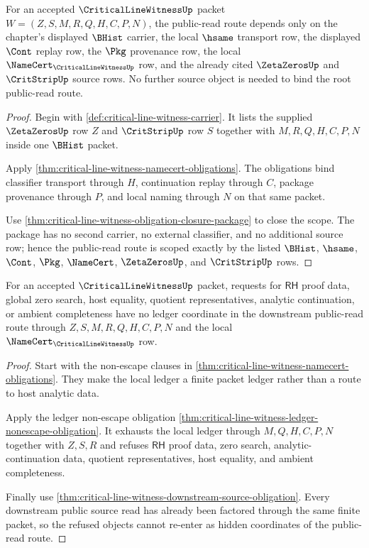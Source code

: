 \begin{theorem}
\label{thm:critical-line-witness-root-scope-binding}
For an accepted $\CriticalLineWitnessUp$ packet $W=(Z,S,M,R,Q,H,C,P,N)$, the
public-read route depends only on the chapter's displayed $\BHist$ carrier,
the local $\hsame$ transport row, the displayed $\Cont$ replay row, the $\Pkg$
provenance row, the local $\NameCert_{\CriticalLineWitnessUp}$ row, and the
already cited $\ZetaZerosUp$ and $\CritStripUp$ source rows. No further source
object is needed to bind the root public-read route.
\end{theorem}
\begin{proof}
Begin with \autoref{def:critical-line-witness-carrier}. It lists the supplied
$\ZetaZerosUp$ row $Z$ and $\CritStripUp$ row $S$ together with $M,R,Q,H,C,P,N$
inside one $\BHist$ packet.

Apply \autoref{thm:critical-line-witness-namecert-obligations}. The obligations
bind classifier transport through $H$, continuation replay through $C$,
package provenance through $P$, and local naming through $N$ on that same
packet.

Use \autoref{thm:critical-line-witness-obligation-closure-package} to close the
scope. The package has no second carrier, no external classifier, and no
additional source row; hence the public-read route is scoped exactly by the
listed $\BHist$, $\hsame$, $\Cont$, $\Pkg$, $\NameCert$, $\ZetaZerosUp$, and
$\CritStripUp$ rows.
\end{proof}

\begin{theorem}
\label{thm:critical-line-witness-root-ledger-refusal-totality}
For an accepted $\CriticalLineWitnessUp$ packet, requests for $\mathsf{RH}$
proof data, global zero search, host equality, quotient representatives,
analytic continuation, or ambient completeness have no ledger coordinate in
the downstream public-read route through $Z,S,M,R,Q,H,C,P,N$ and the local
$\NameCert_{\CriticalLineWitnessUp}$ row.
\end{theorem}
\begin{proof}
Start with the non-escape clauses in
\autoref{thm:critical-line-witness-namecert-obligations}. They make the local
ledger a finite packet ledger rather than a route to host analytic data.

Apply the ledger non-escape obligation
\autoref{thm:critical-line-witness-ledger-nonescape-obligation}. It exhausts
the local ledger through $M,Q,H,C,P,N$ together with $Z,S,R$ and refuses
$\mathsf{RH}$ proof data, zero search, analytic-continuation data, quotient
representatives, host equality, and ambient completeness.

Finally use \autoref{thm:critical-line-witness-downstream-source-obligation}.
Every downstream public source read has already been factored through the same
finite packet, so the refused objects cannot re-enter as hidden coordinates of
the public-read route.
\end{proof}
